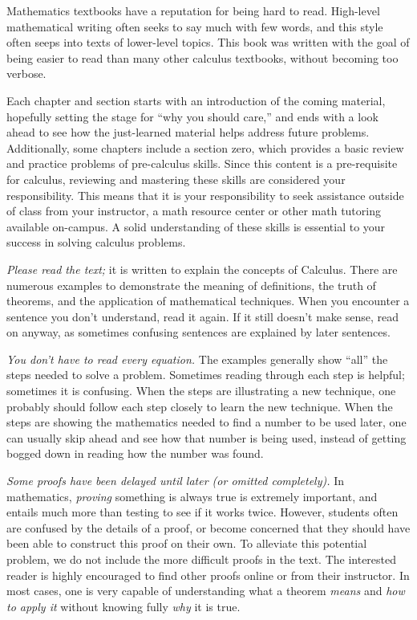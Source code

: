 Mathematics textbooks have a reputation for being hard to read. High-level mathematical writing often seeks to say much with few words, and this style often seeps into texts of lower-level topics. This book was written with the goal of being easier to read than many other calculus textbooks, without becoming too verbose. 

Each chapter and section starts with an introduction of the coming material, hopefully setting the stage for ``why you should care,'' and ends with a look ahead to see how the just-learned material helps address future problems. Additionally, some chapters include a section zero, which provides a basic review and practice problems of pre-calculus skills. Since this content is a pre-requisite for calculus, reviewing and mastering these skills are considered your responsibility. This means that it is your responsibility to seek assistance outside of class from your instructor, a math resource center or other math tutoring available on-campus.  A solid understanding of these skills is essential to your success in solving calculus problems.

\emph{Please read the text;} it is written to explain the concepts of Calculus. There are numerous examples to demonstrate the meaning of definitions, the truth of theorems, and the application of mathematical techniques. When you encounter a sentence you don't understand, read it again. If it still doesn't make sense, read on anyway, as sometimes confusing sentences are explained by later sentences.

\emph{You don't have to read every equation.} The examples generally show ``all'' the steps needed to solve a problem. Sometimes reading through each step is helpful; sometimes it is confusing. When the steps are illustrating a new technique, one probably should follow each step closely to learn the new technique. When the steps are showing the mathematics needed to find a number to be used later, one can usually skip ahead and see how that number is being used, instead of getting bogged down in reading how the number was found.

\emph{Some proofs have been delayed until later (or omitted completely).} In mathematics, \emph{proving} something is always true is extremely important, and entails much more than testing to see if it works twice. However, students often are confused by the details of a proof, or become concerned that they should have been able to construct this proof on their own. To alleviate this potential problem, we do not include the more difficult proofs in the text. The interested reader is highly encouraged to find other proofs online or from their instructor. In most cases, one is very capable of understanding what a theorem \emph{means} and \emph{how to apply it} without knowing fully \emph{why} it is true.

